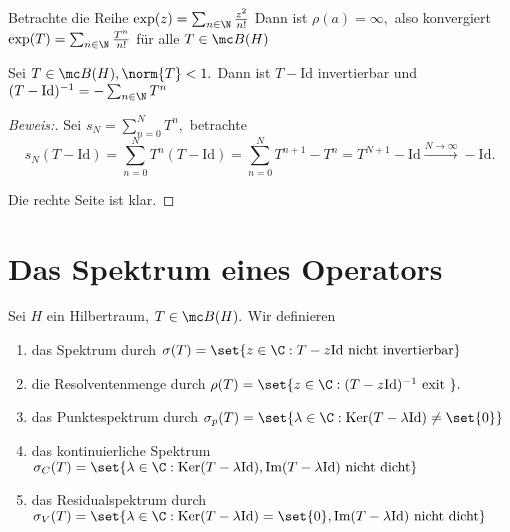 \begin{ex} Betrachte die Reihe $\exp(z) = \sum_{n \in \N} \frac{z^2}{n!}$ Dann ist $\rho(a) = \infty,$ also konvergiert $\exp(T) = \sum_{n\in \N} \frac{T^n}{n!}$ für alle $T \in \mc B(H)$
	
\end{ex}


\begin{ex} Sei $T \in \mc B(H), \norm{T} < 1.$ Dann ist $T - \text{Id}$ invertierbar und $(T- \text{Id})^{-1} = -\sum_{n \in \N} T^n$
	
	
	\begin{proof}[Beweis:] Sei $s_N = \sum_{n = 0}^N T^n,$ betrachte \[ s_N(T- \text{Id}) = \sum_{n = 0}^N T^n (T- \text{Id}) = \sum_{n = 0}^N T^{n+1} - T^n = T^{N+1}- \text{Id} \xrightarrow{N \to \infty} - \text{Id}.\]
		
		
		Die rechte Seite ist klar. 
		
	\end{proof}
	
\end{ex}


\section{Das Spektrum eines Operators}

\begin{definition} Sei $H$ ein Hilbertraum, $T \in \mc B(H).$ Wir definieren
	
	\begin{enumerate}
		
		\item das Spektrum durch $\sigma(T) = \set{z \in \C: T-z \text{Id nicht invertierbar}}$
		
		\item die Resolventenmenge durch $\rho(T) = \set{z \in \C: (T-z \text{Id})^{-1} \text{ exit }}.$
		
		\item das Punktespektrum durch $\sigma_p(T) = \set{\lambda \in \C: \text{Ker}(T-\lambda\text{Id}) \not= \set{0}}$
		
		\item das kontinuierliche Spektrum $\sigma_C(T) = \set{\lambda \in \C: \text{Ker}(T-\lambda \text{Id}), \text{Im}(T- \lambda \text{Id}) \text{ nicht dicht}}$
		
		\item das Residualspektrum durch $\sigma_V(T) = \set{\lambda \in \C: \text{Ker}(T- \lambda \text{Id}) = \set{0}, \text{Im}(T- \lambda \text{Id}) \text{ nicht dicht}}$
		
	\end{enumerate}
	
\end{definition}

